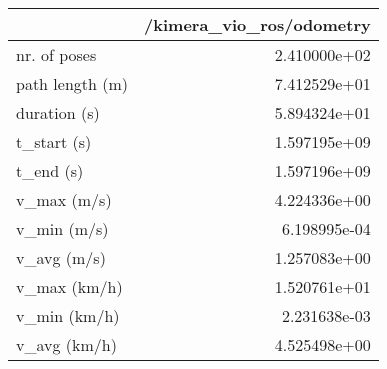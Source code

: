 \begin{tabular}{lr}
\toprule
{} &  /kimera\_vio\_ros/odometry \\
\midrule
nr. of poses    &              2.410000e+02 \\
path length (m) &              7.412529e+01 \\
duration (s)    &              5.894324e+01 \\
t\_start (s)     &              1.597195e+09 \\
t\_end (s)       &              1.597196e+09 \\
v\_max (m/s)     &              4.224336e+00 \\
v\_min (m/s)     &              6.198995e-04 \\
v\_avg (m/s)     &              1.257083e+00 \\
v\_max (km/h)    &              1.520761e+01 \\
v\_min (km/h)    &              2.231638e-03 \\
v\_avg (km/h)    &              4.525498e+00 \\
\bottomrule
\end{tabular}
